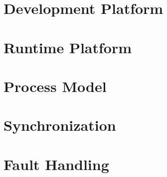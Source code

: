 \documentclass{report}
\begin{document}
\section{Development Platform}

\section{Runtime Platform}

\section{Process Model}

\section{Synchronization}

\section{Fault Handling}
\end{document}
